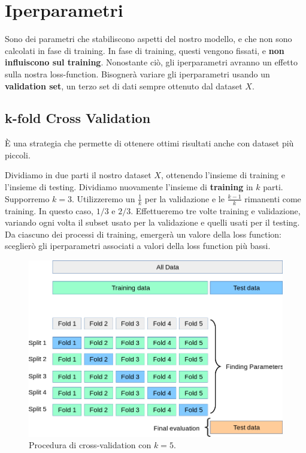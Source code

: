 \section{Iperparametri}
Sono dei parametri che stabiliscono aspetti del nostro modello, e che non sono calcolati in fase di training.
In fase di training, questi vengono fissati, e \textbf{non influiscono sul training}. Nonostante ciò, gli iperparametri avranno un effetto sulla nostra loss-function. Bisognerà variare gli iperparametri usando un \textbf{validation set}, un terzo set di dati sempre ottenuto dal dataset $X$.

\subsection{k-fold Cross Validation}
È una strategia che permette di ottenere ottimi risultati anche con dataset più piccoli.

Dividiamo in due parti il nostro dataset $X$, ottenendo l'insieme di training e l'insieme di testing. Dividiamo nuovamente l'insieme di \textbf{training }in $k$ parti. Supporremo $k=3$. Utilizzeremo un $\frac{1}{k}$ per la validazione e le $\frac{k-1}{k}$ rimanenti come training. In questo caso, $1/3$ e $2/3$. Effettueremo tre volte training e validazione, variando ogni volta il subset usato per la validazione e quelli usati per il testing. Da ciascuno dei processi di training, emergerà un valore della loss function: sceglierò gli iperparametri associati a valori della loss function più bassi.

\begin{figure}[htbp]
	\centering
	\includegraphics[width=\textwidth]{images/cross_validation.png}
	\caption{Procedura di cross-validation con $k=5$.}
	\label{fig:featureExtraction}
\end{figure}

